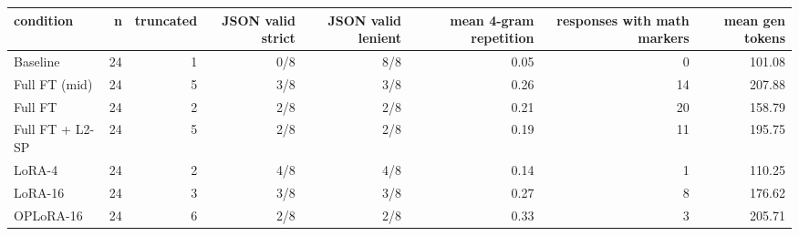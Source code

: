 \begin{tabular}{lrrrrrrr}
\toprule
condition & n & truncated & JSON valid strict & JSON valid lenient & mean 4-gram repetition & responses with math markers & mean gen tokens \\
\midrule
Baseline & 24 & 1 & 0/8 & 8/8 & 0.05 & 0 & 101.08 \\
Full FT (mid) & 24 & 5 & 3/8 & 3/8 & 0.26 & 14 & 207.88 \\
Full FT & 24 & 2 & 2/8 & 2/8 & 0.21 & 20 & 158.79 \\
Full FT + L2-SP & 24 & 5 & 2/8 & 2/8 & 0.19 & 11 & 195.75 \\
LoRA-4 & 24 & 2 & 4/8 & 4/8 & 0.14 & 1 & 110.25 \\
LoRA-16 & 24 & 3 & 3/8 & 3/8 & 0.27 & 8 & 176.62 \\
OPLoRA-16 & 24 & 6 & 2/8 & 2/8 & 0.33 & 3 & 205.71 \\
\bottomrule
\end{tabular}
